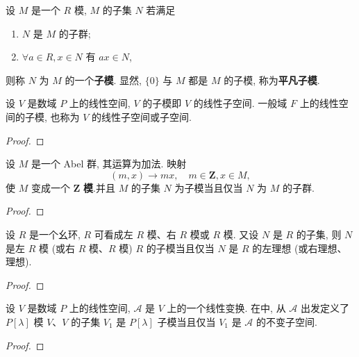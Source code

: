 \documentclass[../../main.tex]{subfiles}
\begin{document}
\begin{definition}
设 \( M \) 是一个 \( R \) 模, \( M \) 的子集 \( N \) 若满足
\begin{enumerate}[(1)]
\item \( N \) 是 \( M \) 的子群;
\item \( \forall a \in R, x \in N \) 有 \( ax \in N \),
\end{enumerate}
则称 \( N \) 为 \( M \) 的一个\textbf{子模}.
显然, \( \{0\} \) 与 \( M \) 都是 \( M \) 的子模, 称为\textbf{平凡子模}.
\end{definition}

\begin{example}
设 \( V \) 是数域 \( P \) 上的线性空间, \( V \) 的子模即 \( V \) 的线性子空间. 一般域 \( F \) 上的线性空间的子模, 也称为 \( V \) 的线性子空间或子空间.
\end{example}
\begin{proof}


\end{proof}

\begin{example}
设 \( M \) 是一个 Abel 群, 其运算为加法. 映射
\[
(m,x) \to mx, \quad m \in \mathbf{Z}, x \in M,
\]
使 \( M \) 变成一个 \( \boldsymbol{Z} \) \textbf{模}.并且 \( M \) 的子集 \( N \) 为子模当且仅当 \( N \) 为 \( M \) 的子群.
\end{example}
\begin{proof}


\end{proof}

\begin{example}
设 \( R \) 是一个幺环, \( R \) 可看成左 \( R \) 模、右 \( R \) 模或 \( R \) 模. 又设 \( N \) 是 \( R \) 的子集, 则 \( N \) 是左 \( R \) 模 (或右 \( R \) 模、\( R \) 模) \( R \) 的子模当且仅当 \( N \) 是 \( R \) 的左理想 (或右理想、理想).
\end{example}
\begin{proof}


\end{proof}

\begin{example}
设 \( V \) 是数域 \( P \) 上的线性空间, \( \mathcal{A} \) 是 \( V \) 上的一个线性变换. 在中, 从 \( \mathcal{A} \) 出发定义了 \( P[\lambda] \) 模 \( V \)、\( V \) 的子集 \( V_1 \) 是 \( P[\lambda] \) 子模当且仅当 \( V_1 \) 是 \( \mathcal{A} \) 的不变子空间.
\end{example}
\begin{proof}


\end{proof}
\end{document}
